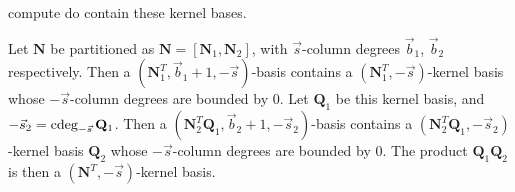 compute do contain these kernel bases.
\begin{lem}
\label{lem:nullspaceBasisOfSubsetOfRowsContainedInOrderBasis}Let
$\mathbf{N}$ be partitioned as $\mathbf{N}=\left[\mathbf{N}_{1},\mathbf{N}_{2}\right]$,
with $\vec{s}$-column degrees $\vec{b}_{1}$, $\vec{b}_{2}$ respectively.
Then a $\left(\mathbf{N}_{1}^{T},\vec{b}_{1}+1,-\vec{s}\right)$-basis
contains a $\left(\mathbf{N}_{1}^{T},-\vec{s}\right)$-kernel basis
whose $-\vec{s}$-column degrees are bounded by 0. Let $\mathbf{Q}_{1}$
be this kernel basis, and $-\vec{s}_{2}=\cdeg_{-\vec{s}}\mathbf{Q}_{1}$.
Then a $\left(\mathbf{N}_{2}^{T}\mathbf{Q}_{1},\vec{b}_{2}+1,-\vec{s}_{2}\right)$-basis
contains a $\left(\mathbf{N}_{2}^{T}\mathbf{Q}_{1},-\vec{s}_{2}\right)$-kernel
basis $\mathbf{Q}_{2}$ whose $-\vec{s}$-column degrees are bounded
by 0. The product $\mathbf{Q}_{1}\mathbf{Q}_{2}$ is then a $\left(\mathbf{N}^{T},-\vec{s}\right)$-kernel
basis.\end{lem}
